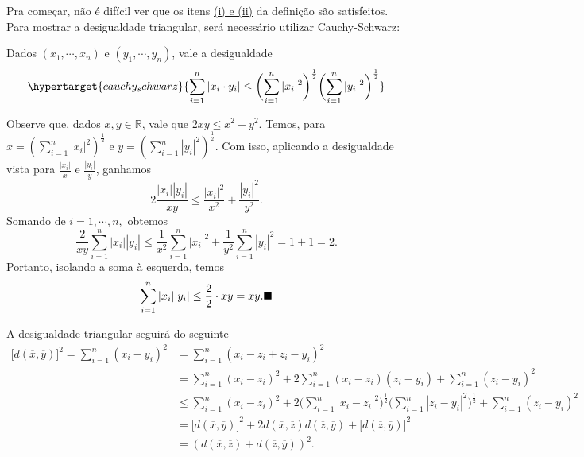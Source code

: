 \documentclass[metric_notes.tex]{subfiles}
\begin{document}
Pra começar, não é difícil ver que os itens \hyperlink{def_metric}{(i) e (ii)} da definição são satisfeitos. Para mostrar a desigualdade triangular, será necessário
utilizar Cauchy-Schwarz:
\begin{lemma*}Dados \((x_{1}, \cdots, x_{n})\) e \((y_{1}, \cdots, y_{n})\), vale a desigualdade
	\[
		\hypertarget{cauchy_schwarz}{\sum\limits_{i=1}^{n}|x_{i}\cdot y_{i}|\leq \biggl(\sum\limits_{i=1}^{n}|x_{i}|^{2}\biggr)^{\frac{1}{2}}\biggl(\sum\limits_{i=1}^{n}|y_{i}|^{2}\biggr)^{\frac{1}{2}} }
	\]
\end{lemma*}
\begin{proof*}
	Observe que, dados \(x, y\in \mathbb{R}\), vale que \(2xy\leq x^{2} + y^{2}\).
	Temos, para \(x=(\sum\limits_{i=1}^{n}|x_{i}|^{2})^{\frac{1}{2}}\) e \(y=(\sum\limits_{i=1}^{n}|y_{i}|^{2})^{\frac{1}{2}}\). Com isso, aplicando a desigualdade vista para
	\(\frac{|x_{i}|}{x}\) e \(\frac{|y_{i}|}{y}\), ganhamos
	\[
		2\frac{|x_{i}||y_{i}|}{xy}\leq \frac{|x_{i}|^{2}}{x^{2}} + \frac{|y_{i}|^{2}}{y^{2}}.
	\]
	Somando de \(i=1, \cdots, n,\) obtemos
	\[
		\frac{2}{xy}\sum\limits_{i=1}^{n}|x_{i}||y_{i}| \leq \frac{1}{x^{2}}\sum\limits_{i=1}^{n}|x_{i}|^{2} + \frac{1}{y^{2}}\sum\limits_{i=1}^{n}|y_{i}|^{2} = 1 + 1 = 2.
	\]
	Portanto, isolando a soma à esquerda, temos
	\[
		\sum\limits_{i=1}^{n}|x_{i}||y_{i}|\leq \frac{2}{2}\cdot xy = xy.\text{$\blacksquare$}
	\]
\end{proof*}
A desigualdade triangular seguirá do seguinte
\begin{align*}
	\bigl[d(\overline{x}, \overline{y})\bigr]^{2} = \sum\limits_{i=1}^{n}(x_{i}-y_{i})^{2} & =\sum\limits_{i=1}^{n}(x_{i}-z_{i}+z_{i}-y_{i})^{2}                                                                                                                                                                          \\
	                                                                                       & =\sum\limits_{i=1}^{n}(x_{i}-z_{i})^{2} + 2\sum\limits_{i=1}^{n}(x_{i}-z_{i})(z_{i}-y_{i}) + \sum\limits_{i=1}^{n}(z_{i}-y_{i})^{2}                                                                                          \\
	                                                                                       & \leq \sum\limits_{i=1}^{n}(x_{i}-z_{i})^{2} + 2\biggl(\sum\limits_{i=1}^{n}|x_{i}-z_{i}|^{2}\biggr)^{\frac{1}{2}}\biggl(\sum\limits_{i=1}^{n}|z_{i}-y_{i}|^{2}\biggr)^{\frac{1}{2}} + \sum\limits_{i=1}^{n}(z_{i}-y_{i})^{2} \\
	                                                                                       & =\bigl[d(\overline{x}, \overline{y})\bigl]^{2} + 2 d(\overline{x}, \overline{z})d(\overline{z}, \overline{y}) + \bigl[d(\overline{z}, \overline{y})\bigr]^{2}                                                                \\
	                                                                                       & = (d(\overline{x}, \overline{z})+d(\overline{z}, \overline{y}))^{2}.
\end{align*}
\end{document}
